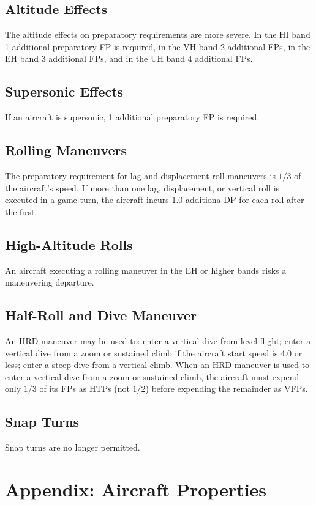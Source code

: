 \documentclass[10pt]{extarticle}
\begin{document}
\subsection{Altitude Effects} The altitude effects on preparatory requirements are more severe. In the HI band 1 additional preparatory FP is required, in the VH band 2 additional FPs, in the EH band 3 additional FPs, and in the UH band 4 additional FPs.

\subsection{Supersonic Effects} If an aircraft is supersonic, 1 additional preparatory FP is required.

\subsection{Rolling Maneuvers} The preparatory requirement for lag and displacement roll maneuvers is $1/3$ of the aircraft's speed. If more than one lag, displacement, or vertical roll is executed in a game-turn, the aircraft incurs 1.0 additiona DP for each roll after the first.

\subsection{High-Altitude Rolls} An aircraft executing a rolling maneuver in the EH or higher bands risks a maneuvering departure.

\subsection{Half-Roll and Dive Maneuver} An HRD maneuver may be used to: enter a vertical dive from level flight; enter a vertical dive from a zoom or sustained climb if the aircraft start speed is 4.0 or less; enter a steep dive from a vertical climb. When an HRD maneuver is used to enter a vertical dive from a zoom or sustained climb, the aircraft must expend only $1/3$ of its FPs as HTPs (not $1/2$) before expending the remainder as VFPs.

\subsection{Snap Turns} Snap turns are no longer permitted.

\section{Appendix: Aircraft Properties}
\end{document}
